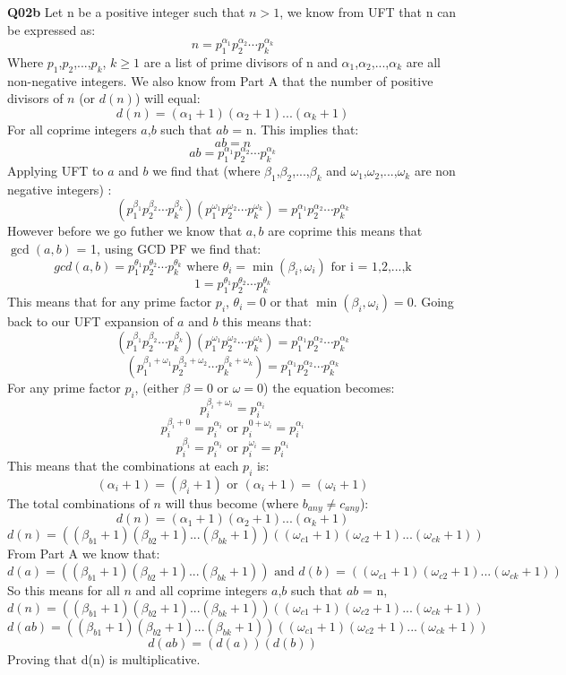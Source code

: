 \documentclass[11pt]{article}
\begin{document}
\textbf{Q02b} Let n be a positive integer such that $n > 1$, we know from UFT that n can be expressed as:
\[  n = p_1^{\alpha_1}p_2^{\alpha_2}\cdots p_k^{\alpha_k} \]
Where $p_1$,$p_2$,...,$p_k$, $k\geq1$ are a list of prime divisors of n and $\alpha_1$,$\alpha_2$,...,$\alpha_k$ are all non-negative integers. We also know from Part A that the number of positive divisors of $n$ (or $d(n)$) will equal:
\[  d(n) = (\alpha_1 + 1)(\alpha_2 + 1)...(\alpha_k + 1) \]
For all coprime integers $a$,$b$  such that $ab$ = n. This implies that:
\[  ab = n \]
\[  ab =  p_1^{\alpha_1}p_2^{\alpha_2}\cdots p_k^{\alpha_k}\]
Applying UFT to $a$ and $b$ we find that (where $\beta_1$,$\beta_2$,...,$\beta_k$ and $\omega_1$,$\omega_2$,...,$\omega_k$ are non negative integers) :
\[  (p_1^{\beta_1}p_2^{\beta_2}\cdots p_k^{\beta_k})(p_1^{\omega_1}p_2^{\omega_2}\cdots p_k^{\omega_k}) =  p_1^{\alpha_1}p_2^{\alpha_2}\cdots p_k^{\alpha_k}\]
However before we go futher we know that $a,b$ are coprime this means that $\gcd(a,b)$ = 1, using GCD PF we find that:
\[ gcd(a,b) =  p_1^{\theta_1}p_2^{\theta_2}\cdots p_k^{\theta_k} \text{ where $\theta_i = \min(\beta_i,\omega_i)$ for i = 1,2,...,k} \]
\[ 1 =  p_1^{\theta_1}p_2^{\theta_2}\cdots p_k^{\theta_k} \]
This means that for any prime factor $p_i$,  $\theta_i = 0$ or that $\min(\beta_i,\omega_i) = 0$. Going back to our UFT expansion of $a$ and $b$ this means that:
\[  (p_1^{\beta_1}p_2^{\beta_2}\cdots p_k^{\beta_k})(p_1^{\omega_1}p_2^{\omega_2}\cdots p_k^{\omega_k}) =  p_1^{\alpha_1}p_2^{\alpha_2}\cdots p_k^{\alpha_k}\]
\[  (p_1^{\beta_1+\omega_1}p_2^{\beta_2+\omega_2}\cdots p_k^{\beta_k+\omega_k}) =  p_1^{\alpha_1}p_2^{\alpha_2}\cdots p_k^{\alpha_k}\]
For any prime factor $p_i$, (either $\beta = 0$ or $\omega = 0$) the equation becomes:
\[  p_i^{\beta_i+\omega_i} =  p_i^{\alpha_i}\]
\[  p_i^{\beta_i+0} =  p_i^{\alpha_i} \text{ or }  p_i^{0+\omega_i} =  p_i^{\alpha_i}\]
\[  p_i^{\beta_i} =  p_i^{\alpha_i} \text{ or }  p_i^{\omega_i} =  p_i^{\alpha_i}\]
This means that the combinations at each $p_i$ is:
\[ ( \alpha_i+1) = ( \beta_i+1) \text{ or }   (\alpha_i+1) = ( \omega_i+1) \]
The total combinations of $n$ will thus become (where $b_{any} \neq c_{any}$):
\[  d(n) = (\alpha_1 + 1)(\alpha_2 + 1)...(\alpha_k + 1) \]
\[ d (n)= ((\beta_{b1} + 1)(\beta_{b2} + 1)...(\beta_{bk} + 1))((\omega_{c1} + 1)(\omega_{c2} + 1)...(\omega_{ck} + 1))  \]
From Part A we know that:
\[ d (a)= ((\beta_{b1} + 1)(\beta_{b2} + 1)...(\beta_{bk} + 1))\text{ and } d(b) = ((\omega_{c1} + 1)(\omega_{c2} + 1)...(\omega_{ck} + 1)) \]
So this means for all $n$ and all coprime integers $a$,$b$  such that $ab$ = n, 
\[ d (n)= ((\beta_{b1} + 1)(\beta_{b2} + 1)...(\beta_{bk} + 1))((\omega_{c1} + 1)(\omega_{c2} + 1)...(\omega_{ck} + 1))  \]
\[ d (ab)= ((\beta_{b1} + 1)(\beta_{b2} + 1)...(\beta_{bk} + 1))((\omega_{c1} + 1)(\omega_{c2} + 1)...(\omega_{ck} + 1))  \]
\[ d (ab)= (d(a))(d(b))\]
Proving that d(n) is multiplicative.
\end{document}
